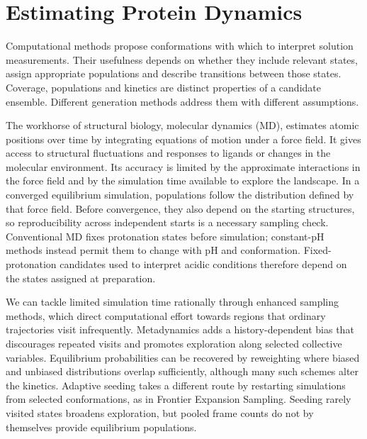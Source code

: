 \section{Estimating Protein Dynamics}
\label{sec:intro-estimation}

Computational methods propose conformations with which to interpret solution measurements. Their usefulness depends on whether they include relevant states, assign appropriate populations and describe transitions between those states. Coverage, populations and kinetics are distinct properties of a candidate ensemble. Different generation methods address them with different assumptions.

The workhorse of structural biology, molecular dynamics (MD), estimates atomic positions over time by integrating equations of motion under a force field. It gives access to structural fluctuations and responses to ligands or changes in the molecular environment. Its accuracy is limited by the approximate interactions in the force field and by the simulation time available to explore the landscape.\supercite{hollingsworthMolecularDynamicsSimulation2018} In a converged equilibrium simulation, populations follow the distribution defined by that force field.\supercite{bmsb2012ch12} Before convergence, they also depend on the starting structures, so reproducibility across independent starts is a necessary sampling check.\supercite{bmsb2012ch2} Conventional MD fixes protonation states before simulation; constant-pH methods instead permit them to change with pH and conformation.\supercite{deoliveiraConstantPHMolecular2022} Fixed-protonation candidates used to interpret acidic conditions therefore depend on the states assigned at preparation.

We can tackle limited simulation time rationally through enhanced sampling methods, which direct computational effort towards regions that ordinary trajectories visit infrequently. Metadynamics adds a history-dependent bias that discourages repeated visits and promotes exploration along selected collective variables.\supercite{barducciMetadynamics2011} Equilibrium probabilities can be recovered by reweighting where biased and unbiased distributions overlap sufficiently, although many such schemes alter the kinetics.\supercite{heninEnhancedSamplingMethods2022} Adaptive seeding takes a different route by restarting simulations from selected conformations, as in Frontier Expansion Sampling.\supercite{zhangFrontierExpansionSampling2020} Seeding rarely visited states broadens exploration, but pooled frame counts do not by themselves provide equilibrium populations.\supercite{heninEnhancedSamplingMethods2022}

